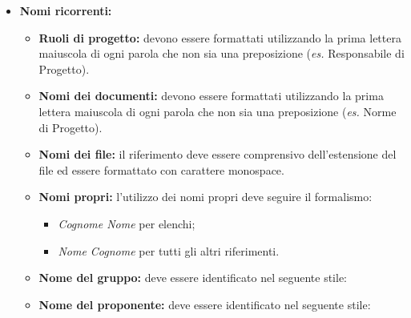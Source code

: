 {{\begin{itemize}
\begin{itemize}
				\item [] \textbf{NP:} Norme di Progetto
				\item [] \textbf{PQ:} Piano di Qualifica
				\item [] \textbf{PP:} Piano di Progetto
				\item [] \textbf{SF:} Studio di Fattibilità
			\end{itemize}
			 e per i nomi delle revisioni
			\begin{itemize}
				\item [] \textbf{RR:} Revisione dei Requisiti
				\item [] \textbf{RP:} Revisione di Progettazione
				\item [] \textbf{RQ:} Revisione di Qualifica
				\item [] \textbf{RA:} Revisione di Accettazione
			\end{itemize}
			\item \textbf{Nomi ricorrenti:}
			\begin{itemize}
				\item \textbf{Ruoli di progetto:} devono essere formattati  utilizzando la prima lettera maiuscola di ogni parola che non sia una preposizione (\textit{es.} Responsabile di Progetto).
				\item \textbf{Nomi dei documenti:} devono essere formattati utilizzando la prima lettera maiuscola di ogni parola che non sia una preposizione (\textit{es.} Norme di Progetto).
				\item \textbf{Nomi dei file:} il riferimento deve essere comprensivo dell'estensione del file ed essere formattato con carattere monospace.
				\item \textbf{Nomi propri:} l'utilizzo dei nomi propri deve seguire il formalismo: 
				\begin{center}
					\begin{itemize}
						\item[] \textit{Cognome Nome} per elenchi;
						\item[] \textit{Nome Cognome} per tutti gli altri riferimenti.
					\end{itemize}	
				\end{center}
				\item \textbf{Nome del gruppo:} deve essere identificato nel seguente stile: 
				\begin{center}
					\textit{\ggt}
				\end{center}
				\item \textbf{Nome del proponente:} deve essere identificato nel seguente stile:

\end{itemize}
\end{itemize}}}
